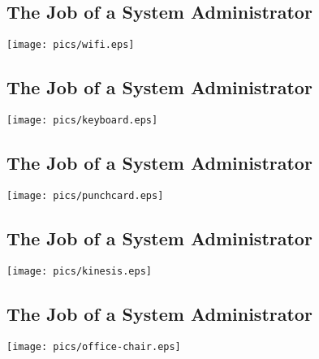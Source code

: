 \documentclass[xga]{xdvislides}
\begin{document}
\subsection{The Job of a System Administrator}
\vspace*{\fill}
\begin{center}
	\texttt{[image: pics/wifi.eps]} \\
\end{center}
\vspace*{\fill}

\subsection{The Job of a System Administrator}
\vspace*{\fill}
\begin{center}
	\texttt{[image: pics/keyboard.eps]} \\
\end{center}
\vspace*{\fill}

\subsection{The Job of a System Administrator}
\vspace*{\fill}
\begin{center}
	\texttt{[image: pics/punchcard.eps]} \\
\end{center}
\vspace*{\fill}

\subsection{The Job of a System Administrator}
\vspace*{\fill}
\begin{center}
	\texttt{[image: pics/kinesis.eps]} \\
\end{center}
\vspace*{\fill}

\subsection{The Job of a System Administrator}
\vspace*{\fill}
\begin{center}
	\texttt{[image: pics/office-chair.eps]} \\
\end{center}
\vspace*{\fill}
\end{document}
